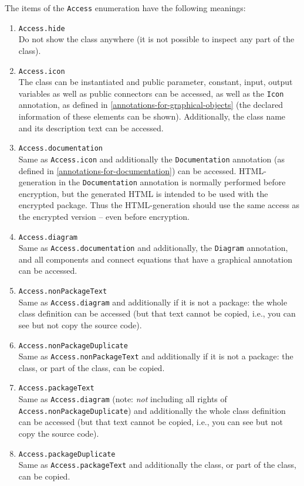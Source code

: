 The items of the \lstinline!Access! enumeration have the following meanings:
\begin{enumerate}
\item
  \lstinline!Access.hide!\\
  Do not show the class anywhere (it is not possible to inspect any part
  of the class).
\item
  \lstinline!Access.icon!\\
  The class can be instantiated and public parameter, constant, input, output variables as well as public connectors can be accessed, as well as the \lstinline!Icon! annotation, as defined in \cref{annotations-for-graphical-objects} (the declared information of these elements can be shown).  Additionally, the class name and its description text can be accessed.
\item
  \lstinline!Access.documentation!\\
  Same as \lstinline!Access.icon! and additionally the \lstinline!Documentation! annotation (as defined in \cref{annotations-for-documentation}) can be accessed.  HTML-generation in the \lstinline!Documentation! annotation is normally performed before encryption, but the generated HTML is intended to be used with the encrypted package.  Thus the HTML-generation should use the same access as the encrypted version -- even before encryption.
\item
  \lstinline!Access.diagram!\\
  Same as \lstinline!Access.documentation! and additionally, the \lstinline!Diagram! annotation, and all components and connect equations that have a graphical annotation can be accessed.
\item
  \lstinline!Access.nonPackageText!\\
  Same as \lstinline!Access.diagram! and additionally if it is not a package: the whole class definition can be accessed (but that text cannot be copied, i.e., you can see but not copy the source code).
\item
  \lstinline!Access.nonPackageDuplicate!\\
  Same as \lstinline!Access.nonPackageText! and additionally if it is not a package: the class, or part of the class, can be copied.
\item
  \lstinline!Access.packageText!\\
  Same as \lstinline!Access.diagram! (note: \emph{not} including all rights of \lstinline!Access.nonPackageDuplicate!) and additionally the whole class definition can be accessed (but that text cannot be copied, i.e., you can see but not copy the source code).
\item
  \lstinline!Access.packageDuplicate!\\
  Same as \lstinline!Access.packageText! and additionally the class, or part of the class, can be copied.
\end{enumerate}

